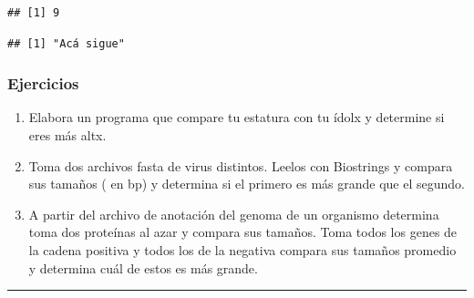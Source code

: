 \documentclass[
]{book}
\newenvironment{Shaded}{\begin{snugshade}}{\end{snugshade}}
\newcommand{\ControlFlowTok}[1]{\textcolor[rgb]{0.13,0.29,0.53}{\textbf{#1}}}
\newcommand{\DecValTok}[1]{\textcolor[rgb]{0.00,0.00,0.81}{#1}}
\newcommand{\FunctionTok}[1]{\textcolor[rgb]{0.13,0.29,0.53}{\textbf{#1}}}
\newcommand{\NormalTok}[1]{#1}
\newcommand{\OtherTok}[1]{\textcolor[rgb]{0.56,0.35,0.01}{#1}}
\newcommand{\SpecialCharTok}[1]{\textcolor[rgb]{0.81,0.36,0.00}{\textbf{#1}}}
\newcommand{\StringTok}[1]{\textcolor[rgb]{0.31,0.60,0.02}{#1}}
\providecommand{\tightlist}{%
  \setlength{\itemsep}{0pt}\setlength{\parskip}{0pt}}
\begin{document}
\begin{verbatim}
## [1] 9
\end{verbatim}

\begin{Shaded}
\end{Shaded}

\begin{verbatim}
## [1] "Acá sigue"
\end{verbatim}

\hypertarget{ejercicios-1}{%
\subsubsection{Ejercicios}\label{ejercicios-1}}

\begin{enumerate}
\def\labelenumi{\arabic{enumi}.}
\tightlist
\item
  Elabora un programa que compare tu estatura con tu ídolx y determine si eres más altx.
\item
  Toma dos archivos fasta de virus distintos. Leelos con Biostrings y compara sus tamaños ( en bp) y determina si el primero es más grande que el segundo.
\item
  A partir del archivo de anotación del genoma de un organismo determina toma dos proteínas al azar y compara sus tamaños. Toma todos los genes de la cadena positiva y todos los de la negativa compara sus tamaños promedio y determina cuál de estos es más grande.
\end{enumerate}

\begin{center}\rule{0.5\linewidth}{0.5pt}\end{center}
\end{document}
